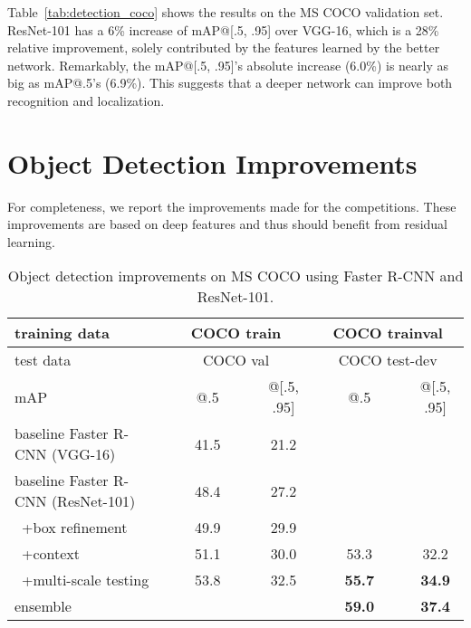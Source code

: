 \documentclass{article}
\renewcommand\arraystretch{1.2}
\begin{document}
Table~\ref{tab:detection_coco} shows the results on the MS COCO validation set. ResNet-101 has a 6\% increase of mAP@[.5, .95] over VGG-16, which is a 28\% relative improvement, solely contributed by the features learned by the better network. Remarkably, the mAP@[.5, .95]'s absolute increase (6.0\%) is nearly as big as mAP@.5's (6.9\%). This suggests that a deeper network can improve both recognition and localization.



\section{Object Detection Improvements}

For completeness, we report the improvements made for the competitions. These improvements are based on deep features and thus should benefit from residual learning.

\renewcommand\arraystretch{1.05}
\setlength{\tabcolsep}{4pt}
\begin{table*}[t]
\begin{center}
\small
\begin{tabular}{l|c|c|c|c}
\hline
training data & \multicolumn{2}{c|}{COCO train} & \multicolumn{2}{c}{COCO trainval} \\
\hline
test data & \multicolumn{2}{c|}{COCO val} & \multicolumn{2}{c}{COCO test-dev}\\
\hline
mAP & ~~~~@.5~~~~ & @[.5, .95] & ~~~~@.5~~~~ & @[.5, .95]\\
\hline
baseline Faster R-CNN (VGG-16)    & 41.5 & 21.2 & \\
baseline Faster R-CNN (ResNet-101)    & 48.4 & 27.2 & \\
~+box refinement &  49.9 & 29.9 & \\
~+context &  51.1 & 30.0 & 53.3 & 32.2 \\
~+multi-scale testing & 53.8 & 32.5 & \textbf{55.7} & \textbf{34.9} \\
\hline
ensemble & & & \textbf{59.0} & \textbf{37.4} \\
\hline
\end{tabular}
\end{center}
\vspace{-.5em}
\caption{Object detection improvements on MS COCO using Faster R-CNN and ResNet-101.}
\vspace{-.5em}
\label{tab:detection_coco_improve}
\end{table*}
\end{document}
